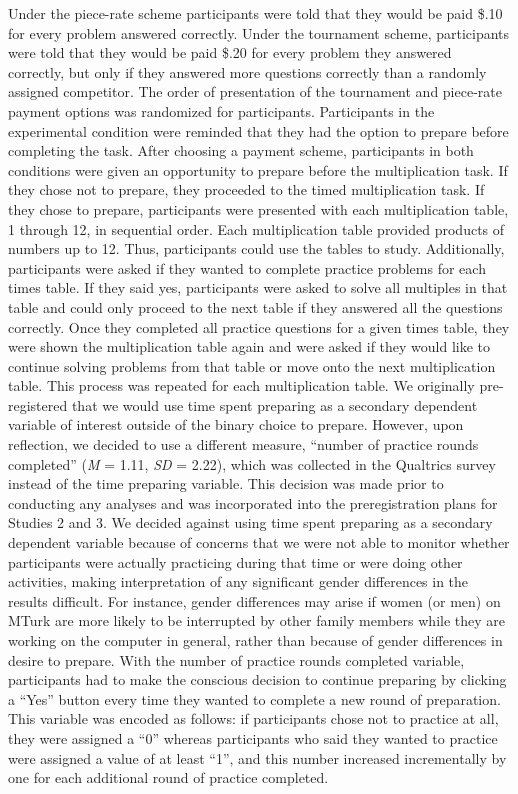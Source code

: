 \documentclass[letterpaper, nobind]{templates/ociamthesis}
\begin{document}
Under the piece-rate scheme participants were told that they would be paid \$.10 for every problem answered correctly. Under the tournament scheme, participants were told that they would be paid \$.20 for every problem they answered correctly, but only if they answered more questions correctly than a randomly assigned competitor. The order of presentation of the tournament and piece-rate payment options was randomized for participants. Participants in the experimental condition were reminded that they had the option to prepare before completing the task. After choosing a payment scheme, participants in both conditions were given an opportunity to prepare before the multiplication task. If they chose not to prepare, they proceeded to the timed multiplication task. If they chose to prepare, participants were presented with each multiplication table, 1 through 12, in sequential order. Each multiplication table provided products of numbers up to 12. Thus, participants could use the tables to study. Additionally, participants were asked if they wanted to complete practice problems for each times table. If they said yes, participants were asked to solve all multiples in that table and could only proceed to the next table if they answered all the questions correctly. Once they completed all practice questions for a given times table, they were shown the multiplication table again and were asked if they would like to continue solving problems from that table or move onto the next multiplication table. This process was repeated for each multiplication table. We originally pre-registered that we would use time spent preparing as a secondary dependent variable of interest outside of the binary choice to prepare. However, upon reflection, we decided to use a different measure, ``number of practice rounds completed'' (\emph{M} = 1.11, \emph{SD} = 2.22), which was collected in the Qualtrics survey instead of the time preparing variable. This decision was made prior to conducting any analyses and was incorporated into the preregistration plans for Studies 2 and 3. We decided against using time spent preparing as a secondary dependent variable because of concerns that we were not able to monitor whether participants were actually practicing during that time or were doing other activities, making interpretation of any significant gender differences in the results difficult. For instance, gender differences may arise if women (or men) on MTurk are more likely to be interrupted by other family members while they are working on the computer in general, rather than because of gender differences in desire to prepare. With the number of practice rounds completed variable, participants had to make the conscious decision to continue preparing by clicking a ``Yes'' button every time they wanted to complete a new round of preparation. This variable was encoded as follows: if participants chose not to practice at all, they were assigned a ``0'' whereas participants who said they wanted to practice were assigned a value of at least ``1'', and this number increased incrementally by one for each additional round of practice completed.
\end{document}
